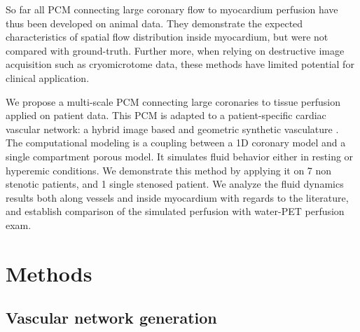 \documentclass[journal]{IEEEtran}
\begin{document}

So far all PCM connecting large coronary flow to myocardium perfusion have thus been developed on animal data. They demonstrate the expected characteristics of spatial flow distribution inside myocardium, but were not compared with ground-truth. Further more, when relying on destructive image acquisition such as cryomicrotome data, these methods have limited potential for clinical application.



We propose a multi-scale PCM connecting large coronaries to tissue perfusion applied on patient data. This PCM is adapted to a patient-specific cardiac vascular network: a hybrid image based and geometric synthetic vasculature \cite{jaquet2019generation}. The computational modeling is a coupling between a 1D coronary model and a single compartment porous model. It simulates fluid behavior either in resting or hyperemic conditions. We demonstrate this method by applying it on 7 non stenotic patients, and 1 single stenosed patient. We analyze the fluid dynamics results both along vessels and inside myocardium with regards to the literature, and establish comparison of the simulated perfusion with water-PET perfusion exam. %
 

\section{Methods}
\subsection{Vascular network generation}
\end{document}
